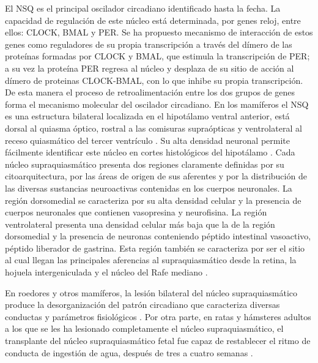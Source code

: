 \documentclass[12pt,letterpaper,final]{article}
\let\cite\cite %
\begin{document}
El NSQ es el principal oscilador circadiano identificado hasta la fecha. La capacidad de regulación de este núcleo está determinada, por genes reloj, entre ellos: CLOCK, BMAL y PER. Se ha propuesto mecanismo de interacción de estos genes como reguladores de su propia transcripción a través del dímero de las proteínas formadas por CLOCK y BMAL, que estimula la transcripción de PER; a su vez la proteína PER regresa al núcleo y desplaza de su sitio de acción al dímero de proteinas CLOCK-BMAL, con lo que inhibe su propia transcripción. De esta manera el proceso de retroalimentación entre los dos grupos de genes forma el mecanismo molecular del oscilador circadiano. En los mamíferos el NSQ es una estructura bilateral localizada en el hipotálamo ventral anterior, está dorsal al quiasma óptico, rostral a las comisuras supraópticas y ventrolateral al receso quiasmático del tercer ventrículo \cite{golombek2007}.
Su alta densidad neuronal permite fácilmente identificar este núcleo en cortes histológicos del hipotálamo \cite{VandenPol1991}.
Cada núcleo supraquiasmático presenta dos regiones claramente definidas por su citoarquitectura, por las áreas de origen de sus aferentes y por la distribución de las diversas sustancias neuroactivas contenidas en los cuerpos neuronales. La región dorsomedial se caracteriza por su alta densidad celular y la presencia de cuerpos neuronales que contienen vasopresina
y neurofisina. La región ventrolateral presenta una densidad celular más baja que la de la región dorsomedial y la presencia de neuronas conteniendo péptido intestinal vasoactivo, péptido liberador de gastrina. Esta región también se caracteriza por ser el sitio al cual llegan las principales aferencias al supraquiasmático desde la retina, la hojuela intergeniculada y el núcleo del Rafe mediano \cite{VandenPol1991}.

En roedores y otros mamíferos, la lesión bilateral del núcleo supraquiasmático produce la desorganización del patrón circadiano que caracteriza diversas conductas y parámetros fisiológicos \cite{Aguilar-Roblero1987}. Por otra parte, en ratas y hámsteres adultos a los que se les ha lesionado completamente el núcleo supraquiasmático, el transplante del núcleo supraquiasmático fetal fue capaz de restablecer el ritmo de conducta de ingestión de agua, después de tres a cuatro semanas \cite{Drucker-Colin1984}.
\end{document}
